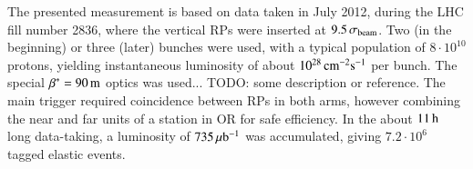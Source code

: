 The presented measurement is based on data taken in July 2012, during the LHC fill number 2836, where the vertical
RPs were inserted at $9.5\,\sigma_{\rm beam}$. Two (in the beginning) or three (later) bunches were used, with
a typical population of $8\cdot10^{10}$ protons, yielding instantaneous luminosity of about $10^{28}\,{\rm cm^{-2}s^{-1}}$ per bunch. The special
$\beta^* = 90\,{\rm m}$ optics was used... TODO: some description or reference. The main trigger required coincidence between RPs in both arms,
however combining the near and far units of a station in OR for safe efficiency. In the about $11\,{\rm h}$ long
data-taking, a luminosity of $735\,{\rm \mu b^{-1}}$ was accumulated, giving
$7.2\cdot 10^6$ tagged elastic events.

